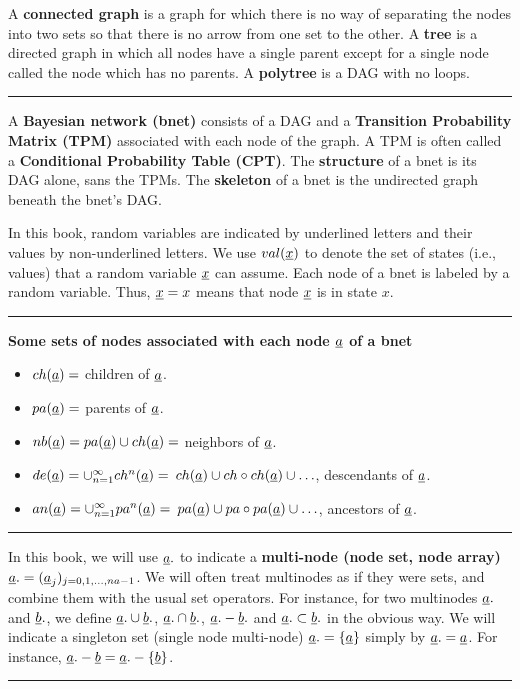 A {\bf connected graph}
is a graph for which there
is no way of separating
the nodes into
two sets so that there is no arrow
from one set to the other.
A {\bf tree}
is a directed graph
in which all nodes
have a single parent
except for a single
node called the  node
which has no parents.
A {\bf polytree}
is a DAG with
no loops.





\hrule

A {\bf Bayesian network (bnet)}
consists of a DAG
and a
{\bf Transition
Probability Matrix (TPM)}
associated
with each node
of the graph.
A TPM is often
called a {\bf Conditional Probability
Table
(CPT)}.
The {\bf structure} of a bnet
is its DAG alone, sans the TPMs.
The
{\bf skeleton} of a bnet is the
undirected graph beneath the bnet's
DAG.



In
this book,
random  variables are
 indicated by
underlined letters and their values
by non-underlined letters.
We use $val(\rvx)$
to denote the set of states (i.e., values)
that a random variable $\rvx$ can assume.
 Each node of a bnet is
 labeled by a random variable.
 Thus, $\rvx=x$ means that node
$\rvx$ is in state $x$.

\hrule\noindent
{\bf Some sets of nodes
associated
with each node $\rva$
of a bnet}
\begin{itemize}
\item
$ch(\rva)=$ children of $\rva$.
\item
$pa(\rva)=$ parents of $\rva$.
\item
$nb(\rva)=pa(\rva)\cup ch(\rva)=$
neighbors of $\rva$.
\item
$de(\rva)=\cup_{n=1}^{\infty}ch^n(\rva)=$
$ch(\rva)\cup ch\circ ch(\rva)\cup\ldots$,
descendants of $\rva$.
\item
$an(\rva)=\cup_{n=1}^{\infty}pa^n(\rva)=$
$pa(\rva)\cup pa\circ pa(\rva)\cup\ldots$,
ancestors of $\rva$.
\end{itemize}
\hrule
In this book,
we will use
$\rva.$
to indicate
a {\bf multi-node (node set,
node array)} $\rva.=
(\rva_j)_{j=0, 1, \ldots , na-1}$.
We will often
treat multinodes as if
they were sets, and
combine them with
the usual
set
operators.
For instance,
for two
multinodes $\rva.$
and $\rvb.$,
we define
$\rva.\cup\rvb.$,
$\rva.\cap\rvb.$,
$\rva.-\rvb.$
and
$\rva.\subset\rvb.$
in the obvious way.
We
will indicate
a singleton set (single
node multi-node) $\rva.=\{\rva\}$
simply by $\rva.=\rva$.
For instance,
$\rva.-\rvb=\rva.-\{\rvb\}$.
\hrule

